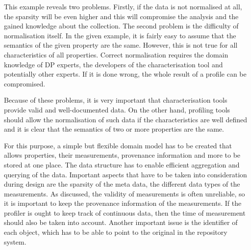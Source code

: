 This example reveals two problems. Firstly, if the data is not normalised at all, the sparsity will be even higher and this will compromise the analysis and the gained knowledge about the collection. The second problem is the difficulty of normalisation itself. In the given example, it is fairly easy to assume that the semantics of the given property are the same. However, this is not true for all characteristics of all properties. Correct normalisation requires the domain knowledge of DP experts, the developers of the characterisation tool and potentially other experts. If it is done wrong, the whole result of a profile can be compromised.

Because of these problems, it is very important that characterisation tools provide valid and well-documented data. On the other hand, profiling tools should allow the normalisation of such data if the characteristics are well defined and it is clear that the semantics of two or more properties are the same.

For this purpose, a simple but flexible domain model has to be created that allows properties, their measurements, provenance information and more to be stored at one place. The data structure has to enable efficient aggregation and querying of the data. Important aspects that have to be taken into consideration during design are the sparsity of the meta data, the different data types of the measurements. As discussed, the validity of measurements is often unreliable, so it is important to keep the provenance information of the measurements. If the profiler is ought to keep track of continuous data, then the time of measurement should also be taken into account. Another important issue is the identifier of each object, which has to be able to point to the original in the repository system.


